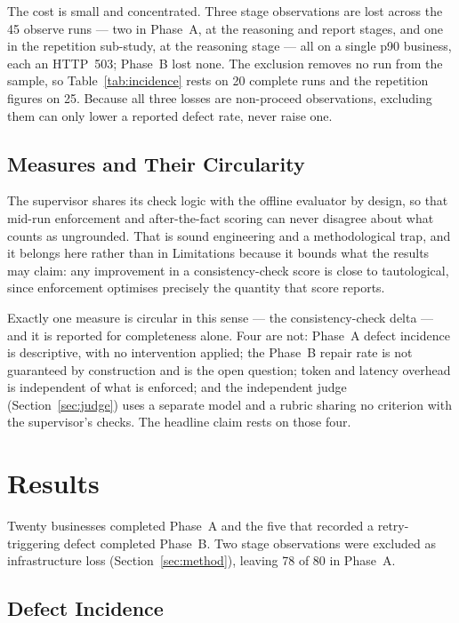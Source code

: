 \documentclass[runningheads]{llncs}
\begin{document}
The cost is small and concentrated. Three stage observations are lost across the
45 observe runs --- two in Phase~A, at the reasoning and report stages, and one in
the repetition sub-study, at the reasoning stage --- all on a single p90 business,
each an HTTP~503; Phase~B lost none. The exclusion removes no run from the sample,
so Table~\ref{tab:incidence} rests on 20 complete runs and the repetition figures
on 25. Because all three losses are non-proceed observations, excluding them can
only lower a reported defect rate, never raise one.

\subsection{Measures and Their Circularity}
\label{sec:measures}

The supervisor shares its check logic with the offline evaluator by design, so
that mid-run enforcement and after-the-fact scoring can never disagree about what
counts as ungrounded. That is sound engineering and a methodological trap, and it
belongs here rather than in Limitations because it bounds what the results may
claim: any improvement in a consistency-check score is close to tautological,
since enforcement optimises precisely the quantity that score reports.

Exactly one measure is circular in this sense --- the consistency-check delta ---
and it is reported for completeness alone. Four are not: Phase~A defect incidence
is descriptive, with no intervention applied; the Phase~B repair rate is not
guaranteed by construction and is the open question; token and latency overhead is
independent of what is enforced; and the independent judge
(Section~\ref{sec:judge}) uses a separate model and a rubric sharing no criterion
with the supervisor's checks. The headline claim rests on those four.

\section{Results}
\label{sec:results}

Twenty businesses completed Phase~A and the five that recorded a retry-triggering
defect completed Phase~B. Two stage observations were excluded as infrastructure
loss (Section~\ref{sec:method}), leaving 78 of 80 in Phase~A.

\subsection{Defect Incidence}
\end{document}
